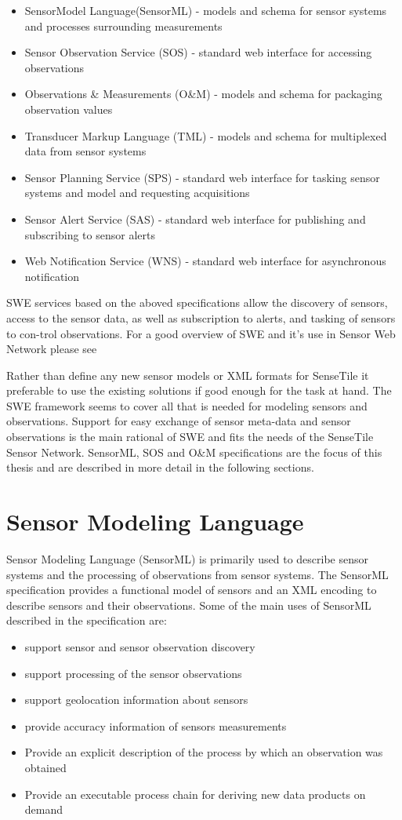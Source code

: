 \documentclass[]{final_report}
\begin{document}
\begin{itemize}
\item  SensorModel Language(SensorML) - models and schema for sensor systems and processes surrounding measurements
\item  Sensor Observation Service (SOS) - standard web interface for accessing observations
\item  Observations \& Measurements (O\&M) - models and schema for packaging observation values
\item  Transducer Markup Language (TML) - models and schema for multiplexed data from sensor systems
\item  Sensor Planning Service (SPS) - standard web interface for tasking sensor systems and model and requesting acquisitions
\item   Sensor Alert Service (SAS) - standard web interface for publishing and subscribing to sensor alerts
\item   Web Notification Service (WNS) - standard web interface for asynchronous notification
\end{itemize}

SWE services based on the aboved specifications allow the discovery of sensors, access to the sensor data, as well as subscription to alerts, and tasking of sensors to con-trol observations. For a good overview of SWE and it's use in Sensor Web Network please see \cite{SWEArchref}

Rather than define any new sensor models or XML formats for SenseTile it preferable to use the existing solutions if good enough for the task at hand. The SWE framework seems to cover all that is needed for modeling sensors and observations. Support for easy exchange of sensor meta-data and sensor observations is the main rational of SWE and fits the needs of the SenseTile Sensor Network.  SensorML, SOS and O\&M specifications are the focus of this thesis and are described in more detail in the following sections.

\section{Sensor Modeling Language}
Sensor Modeling Language (SensorML) is primarily used to describe sensor systems and the processing of observations from sensor systems. The SensorML specification\cite{SMLref} provides a functional model of sensors and an XML encoding to describe sensors and their observations. Some of the main uses of SensorML described in the specification are:
\begin{itemize}
\item support sensor and sensor observation discovery
\item support processing of the sensor observations
\item support geolocation information about sensors
\item provide accuracy information of sensors measurements
\item Provide an explicit description of the process by which an observation was obtained
\item Provide an executable process chain for deriving new data products on demand
\end{itemize}
\end{document}
